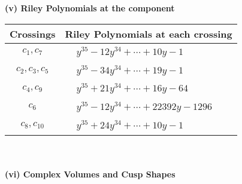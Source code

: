 \documentclass[1p]{elsarticle_modified}
\theoremstyle{definition}
\begin{document}
\newpage\renewcommand{\arraystretch}{1}
\flushleft \textbf{(v) Riley Polynomials at the component}\newline \\
\begin{tabular}{m{50pt}|m{274pt}}
Crossings & \hspace{64pt}Riley Polynomials at each crossing \\
\hline $$\begin{aligned}c_{1},c_{7}\end{aligned}$$&$\begin{aligned}
&y^{35}-12 y^{34}+\cdots+10 y-1
\end{aligned}$\\
\hline $$\begin{aligned}c_{2},c_{3},c_{5}\end{aligned}$$&$\begin{aligned}
&y^{35}-34 y^{34}+\cdots+19 y-1
\end{aligned}$\\
\hline $$\begin{aligned}c_{4},c_{9}\end{aligned}$$&$\begin{aligned}
&y^{35}+21 y^{34}+\cdots+16 y-64
\end{aligned}$\\
\hline $$\begin{aligned}c_{6}\end{aligned}$$&$\begin{aligned}
&y^{35}-12 y^{34}+\cdots+22392 y-1296
\end{aligned}$\\
\hline $$\begin{aligned}c_{8},c_{10}\end{aligned}$$&$\begin{aligned}
&y^{35}+24 y^{34}+\cdots+10 y-1
\end{aligned}$\\
\hline
\end{tabular}\\~\\
\newpage\flushleft \textbf{(vi) Complex Volumes and Cusp Shapes}
\end{document}
